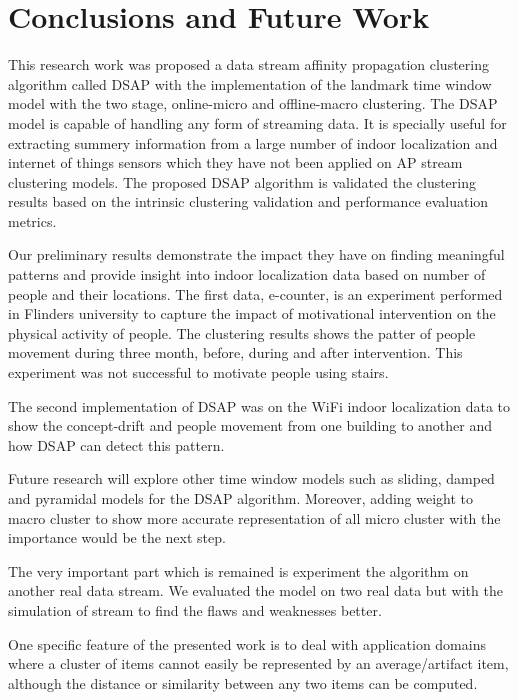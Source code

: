 \setlength{\parindent}{2em}

% 
\chapter{Conclusions and Future Work}

This research work was proposed a data stream affinity propagation clustering algorithm called DSAP with the implementation of the landmark time window model with the two stage, online-micro and offline-macro clustering. The DSAP model is capable of handling any form of streaming data. It is specially useful for extracting summery information from a large number of indoor localization and internet of things sensors which they have not been applied on AP stream clustering models.
The proposed DSAP algorithm is validated the clustering results based on the intrinsic clustering validation and performance evaluation metrics.  

Our preliminary results demonstrate the impact they have on finding meaningful patterns and provide insight into indoor localization data based on number of people and their locations. The first data, e-counter, is an experiment performed in Flinders university to capture the impact of motivational intervention on the physical activity of people. The clustering results shows the patter of people movement during three month, before, during and after intervention. This experiment was not successful to motivate people using stairs.

The second implementation of DSAP was on the WiFi indoor localization data to show the concept-drift and people movement from one building to another and how DSAP can detect this pattern.  

Future research will explore other time window models such as sliding, damped and pyramidal models for the DSAP algorithm. Moreover, adding weight to macro cluster to show more accurate representation of all micro cluster with the importance would be the next step.  

The very important part which is remained is experiment the algorithm on another real data stream. We evaluated the model on two real data but with the simulation of stream to find the flaws and weaknesses better.

One specific feature of the presented work is to deal with application domains where a cluster of items cannot easily be represented by an average/artifact item, although the distance or similarity between any two items can be computed. 


